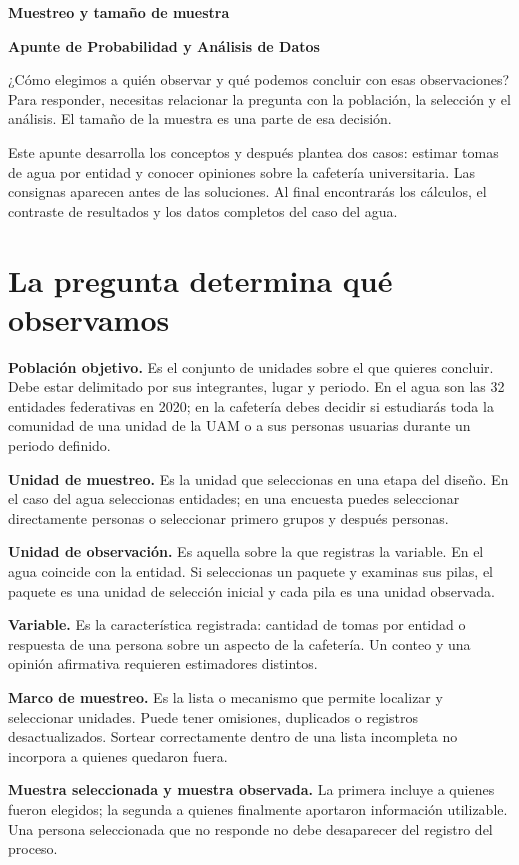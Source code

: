\documentclass[11pt,letterpaper]{article}
\begin{document}
{\LARGE\bfseries Muestreo y tamaño de muestra\par}\medskip
\textbf{Apunte de Probabilidad y Análisis de Datos}\par
¿Cómo elegimos a quién observar y qué podemos concluir con esas observaciones? Para responder, necesitas relacionar la pregunta con la población, la selección y el análisis. El tamaño de la muestra es una parte de esa decisión.

Este apunte desarrolla los conceptos y después plantea dos casos: estimar tomas de agua por entidad y conocer opiniones sobre la cafetería universitaria. Las consignas aparecen antes de las soluciones. Al final encontrarás los cálculos, el contraste de resultados y los datos completos del caso del agua.
\section{La pregunta determina qué observamos}
\textbf{Población objetivo.} Es el conjunto de unidades sobre el que quieres concluir. Debe estar delimitado por sus integrantes, lugar y periodo. En el agua son las 32 entidades federativas en 2020; en la cafetería debes decidir si estudiarás toda la comunidad de una unidad de la UAM o a sus personas usuarias durante un periodo definido.

\textbf{Unidad de muestreo.} Es la unidad que seleccionas en una etapa del diseño. En el caso del agua seleccionas entidades; en una encuesta puedes seleccionar directamente personas o seleccionar primero grupos y después personas.

\textbf{Unidad de observación.} Es aquella sobre la que registras la variable. En el agua coincide con la entidad. Si seleccionas un paquete y examinas sus pilas, el paquete es una unidad de selección inicial y cada pila es una unidad observada.

\textbf{Variable.} Es la característica registrada: cantidad de tomas por entidad o respuesta de una persona sobre un aspecto de la cafetería. Un conteo y una opinión afirmativa requieren estimadores distintos.

\textbf{Marco de muestreo.} Es la lista o mecanismo que permite localizar y seleccionar unidades. Puede tener omisiones, duplicados o registros desactualizados. Sortear correctamente dentro de una lista incompleta no incorpora a quienes quedaron fuera.

\textbf{Muestra seleccionada y muestra observada.} La primera incluye a quienes fueron elegidos; la segunda a quienes finalmente aportaron información utilizable. Una persona seleccionada que no responde no debe desaparecer del registro del proceso.
\end{document}
